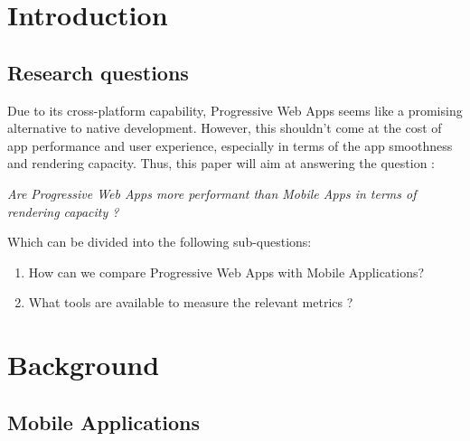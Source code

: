 

\chapter{Introduction}
\section{Research questions}

\iffalse
Primary research question : 
\newline \textit{How efficient can Progressive Web Apps be compared to a Native Android Application?}
\newline
Secondary Research questions :
\\1. \textit{How can we compare Progressive Web Apps and Mobile Apps ?}
\newline \indent
1.1 \textit{What metrics are relevant to compare Progressive Web Apps and Mobile Apps ?}
\newline \indent  
1.2 \textit{What tools are available to measure those metrics?}
\newline
\\2. \textit{Are Progressive Web Apps more efficient than Mobile Apps with regards to the first question?}
\fi

Due to its cross-platform capability, Progressive Web Apps seems like a promising alternative to native development. However, this shouldn't come at the cost of app performance and user experience, especially in terms of the app smoothness and rendering capacity.
Thus, this paper will aim at answering the question : 
\begin{center}
    \textit{Are Progressive Web Apps more performant than Mobile Apps in terms of rendering capacity ?}
\end{center}
Which can be divided into the following sub-questions: 
\begin{enumerate}
    \item How can we compare Progressive Web Apps with Mobile Applications?
    \item What tools are available to measure the relevant metrics ?
\end{enumerate}

\chapter{Background}
\section{Mobile Applications}
